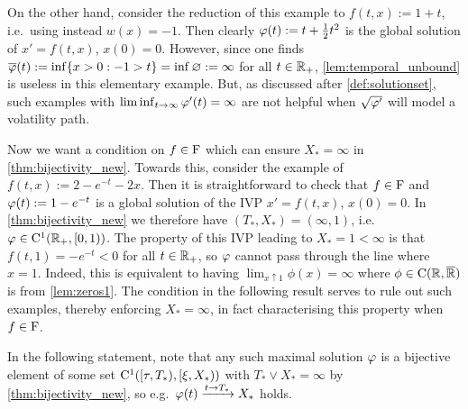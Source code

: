 On the other hand, consider the reduction of this example to $f(t,x):=1 + t$, i.e.~using instead $w(x)=-1$. Then clearly $\varphi(t):=t + \frac12 t^2$ is the global solution of $x'=f(t,x)$, $x(0)=0$. However, since one finds $\overline{\varphi}(t):=\inf\{x>0:-1>t\}=\inf\varnothing:=\infty$ for all $t\in\mathbb{R}_+$, \autoref{lem:temporal_unbound} is useless in this elementary example. But, as discussed after \autoref{def:solutionset}, such examples with $\liminf_{t\to\infty}\varphi'(t)=\infty$ are not helpful when $\sqrt{\varphi'}$ will model a volatility path.

Now we want a condition on $f\in\mathrm{F}$ which can ensure $X_*=\infty$ in \autoref{thm:bijectivity_new}. Towards this, consider the example of $f(t,x):=2-e^{-t}-2x$. Then it is straightforward to check that $f\in\mathrm{F}$ and  $\varphi(t):=1-e^{-t}$ is a global solution of the IVP $x'=f(t,x)$, $x(0)=0$. In \autoref{thm:bijectivity_new} we therefore have $(T_*,X_*)=(\infty,1)$, i.e.~$\varphi\in\mathrm{C}^1(\mathbb{R}_+,[0,1))$. The property of this IVP leading to $X_*=1<\infty$ is that $f(t,1)=-e^{-t}<0$ for all $t\in\mathbb{R}_+$, so $\varphi$ cannot pass through the line where $x=1$. Indeed, this is equivalent to having $\lim_{x\uparrow 1}\phi(x)=\infty$ where $\phi\in\mathrm{C}(\mathbb{R},{\overline{\mathbb{R}}})$ is from \autoref{lem:zeros1}. The condition in the following result serves to rule out such examples, thereby enforcing $X_*=\infty$, in fact characterising this property when $f\in\mathrm{F}$.

In the following statement, note that any such maximal solution $\varphi$ is a bijective element of some set $\mathrm{C}^1([\tau,T_*),[\xi,X_*))$ with $T_*\vee X_*=\infty$ by \autoref{thm:bijectivity_new}, so e.g.~$\varphi(t)\xrightarrow{t\to T_*}X_*$ holds.


